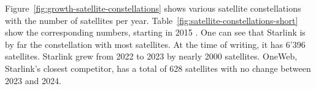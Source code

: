 Figure~\ref{fig:growth-satellite-constellations} shows various satellite constellations with the number of satellites per year. Table~\ref{fig:satellite-constellations-short} show the corresponding numbers, starting in 2015 \cite{Richter2024}.
One can see that Starlink is by far the constellation with most satellites.
At the time of writing, it has 6'396 satellites. Starlink grew from 2022 to 2023 by nearly 2000 satellites.
OneWeb, Starlink's closest competitor, has a total of 628 satellites with no change between 2023 and 2024.

